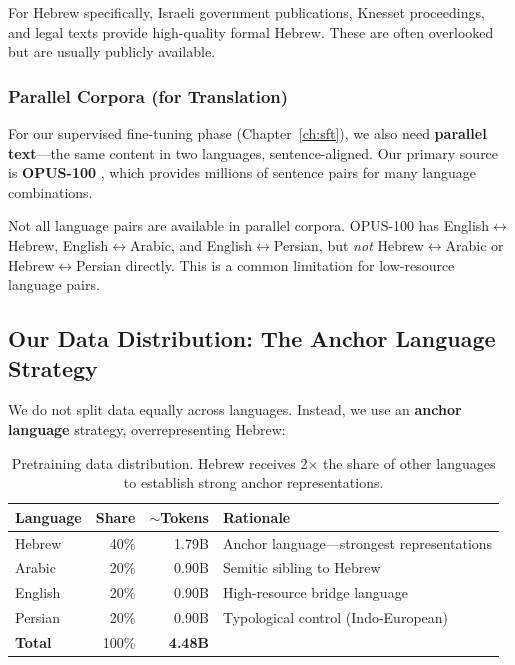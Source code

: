 \documentclass[11pt,a4paper]{article}
\begin{document}
For Hebrew specifically, Israeli government publications, Knesset proceedings, and legal texts provide high-quality formal Hebrew. These are often overlooked but are usually publicly available.

\subsubsection{Parallel Corpora (for Translation)}

For our supervised fine-tuning phase (Chapter~\ref{ch:sft}), we also need \textbf{parallel text}---the same content in two languages, sentence-aligned. Our primary source is \textbf{OPUS-100} \citep{zhang2020improving}, which provides millions of sentence pairs for many language combinations.

\begin{warning}
Not all language pairs are available in parallel corpora. OPUS-100 has English$\leftrightarrow$Hebrew, English$\leftrightarrow$Arabic, and English$\leftrightarrow$Persian, but \emph{not} Hebrew$\leftrightarrow$Arabic or Hebrew$\leftrightarrow$Persian directly. This is a common limitation for low-resource language pairs.
\end{warning}

\subsection{Our Data Distribution: The Anchor Language Strategy}

We do not split data equally across languages. Instead, we use an \textbf{anchor language} strategy, overrepresenting Hebrew:

\begin{table}[H]
\centering
\begin{tabular}{lrrl}
\toprule
\textbf{Language} & \textbf{Share} & \textbf{$\sim$Tokens} & \textbf{Rationale} \\
\midrule
Hebrew & 40\% & 1.79B & Anchor language---strongest representations \\
Arabic & 20\% & 0.90B & Semitic sibling to Hebrew \\
English & 20\% & 0.90B & High-resource bridge language \\
Persian & 20\% & 0.90B & Typological control (Indo-European) \\
\midrule
\textbf{Total} & 100\% & \textbf{4.48B} & \\
\bottomrule
\end{tabular}
\caption{Pretraining data distribution. Hebrew receives 2$\times$ the share of other languages to establish strong anchor representations.}
\label{tab:data_dist}
\end{table}
\end{document}
